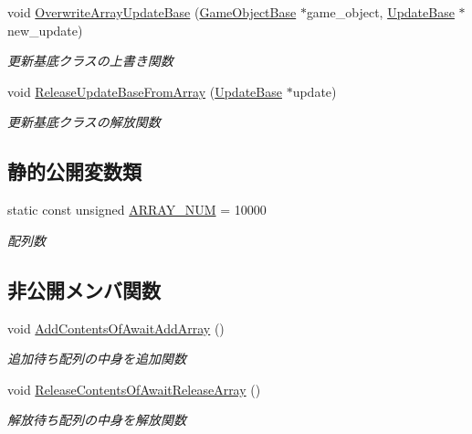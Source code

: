 \begin{DoxyCompactItemize}
void \mbox{\hyperlink{class_update_manager_ab4f492c33ed941ddd01ccae8218080ff}{Overwrite\+Array\+Update\+Base}} (\mbox{\hyperlink{class_game_object_base}{Game\+Object\+Base}} $\ast$game\+\_\+object, \mbox{\hyperlink{class_update_base}{Update\+Base}} $\ast$new\+\_\+update)
\begin{DoxyCompactList}\small\item\em 更新基底クラスの上書き関数 \end{DoxyCompactList}\item 
void \mbox{\hyperlink{class_update_manager_a8a54226896f4280b589af85c07e869d9}{Release\+Update\+Base\+From\+Array}} (\mbox{\hyperlink{class_update_base}{Update\+Base}} $\ast$update)
\begin{DoxyCompactList}\small\item\em 更新基底クラスの解放関数 \end{DoxyCompactList}\end{DoxyCompactItemize}
\subsection*{静的公開変数類}
\begin{DoxyCompactItemize}
\item 
static const unsigned \mbox{\hyperlink{class_update_manager_a280b884fb6a025cfd92d4f93086c60c6}{A\+R\+R\+A\+Y\+\_\+\+N\+UM}} = 10000
\begin{DoxyCompactList}\small\item\em 配列数 \end{DoxyCompactList}\end{DoxyCompactItemize}
\subsection*{非公開メンバ関数}
\begin{DoxyCompactItemize}
\item 
void \mbox{\hyperlink{class_update_manager_a7bb1af3bffcc4d72333ac86ae411891e}{Add\+Contents\+Of\+Await\+Add\+Array}} ()
\begin{DoxyCompactList}\small\item\em 追加待ち配列の中身を追加関数 \end{DoxyCompactList}\item 
void \mbox{\hyperlink{class_update_manager_ac87db8037fbfb800187c50ca22a1f01d}{Release\+Contents\+Of\+Await\+Release\+Array}} ()
\begin{DoxyCompactList}\small\item\em 解放待ち配列の中身を解放関数 \end{DoxyCompactList}\end{DoxyCompactItemize}
